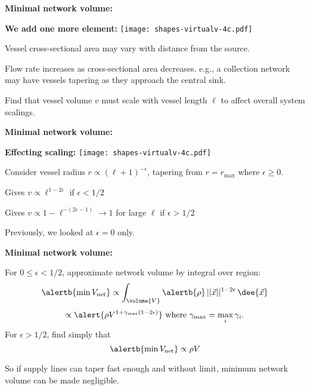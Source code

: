   \textbf{Minimal network volume:}

  \textbf{We add one more element:}
    \texttt{[image: shapes-virtualv-4c.pdf]}
    
     Vessel cross-sectional area
      may vary with distance from the source.
    
      Flow rate increases as cross-sectional area decreases.
     e.g., a collection network may
      have vessels tapering as they approach
      the central sink.
    
      Find that vessel volume $v$ must scale
      with vessel length $\ell$ to affect overall
      system scalings.
    
  

  \textbf{Minimal network volume:}

  \textbf{Effecting scaling:}
    \texttt{[image: shapes-virtualv-4c.pdf]}
    
    
      Consider vessel radius $r \propto (\ell+1)^{-\epsilon}$,
      tapering from $r=r_{\max}$ where $\epsilon \ge 0$.
    
      Gives
      $
      v \propto \ell^{1-2\epsilon}
      $ if $\epsilon < 1/2$
    
      Gives
      $
      v \propto 1 - \ell^{-(2\epsilon-1)} \rightarrow 1$ for large $\ell$
      if $\epsilon > 1/2$
    
      Previously, we looked at $\epsilon=0$ only.
    
  

  \textbf{Minimal network volume:}

  For $0 \le \epsilon < 1/2$, approximate network volume by integral over region:
  $$ 
  \alertb{\min V_{\textnormal{net}}}  \propto 
  \int_{\volume{V}} \alertb{\rho} \, ||\vec{x}||^{1-2\epsilon} \, \dee{\vec{x}} 
  $$
  {}
  {
    $$
    \propto
    \alert{ \rho V^{1+\gamma_{\max}(1-2\epsilon)} } 
    \
    \mbox{where}
    \
    \gamma_{\max} = \max_{i} \gamma_i.
    $$
  }
  {
    For $\epsilon > 1/2$, find simply that 
    $$
    \alertb{\min V_{\textnormal{net}}}  
    \propto 
    \rho V
    $$
  }
  
  
    So if supply lines can taper fast enough and without
    limit, minimum network volume can be made negligible.
%  
  

